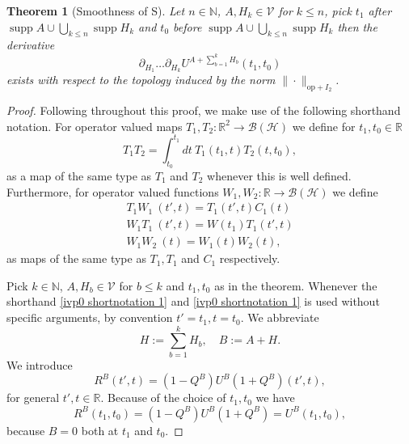 \documentclass[b5paper,draft,openbib,12pt]{memoir}
\newtheorem{Thm}[Def]{Theorem}
\DeclareMathOperator*{\supp}{supp}
\begin{document}
\begin{Thm}[Smoothness of S]\label{thm smoothness of S}
Let \(n\in\mathbb{N}\),  \(A,H_{k}\in\mathcal{V}\) for 
\(k\le n\), pick \(t_1\) 
after \(\supp A\cup \bigcup_{k\le n}\supp H_k\) and \(t_0\)
before \(\supp A\cup\bigcup_{k\le n}\supp H_k\) then 
the derivative 
\begin{equation}
  \partial_{H_1}\dots \partial_{H_k}U^{A+\sum_{b=1}^k H_b}(t_1,t_0)
\end{equation}
exists with respect to the topology induced by 
the norm \(\|\cdot\|_{\mathrm{op}+I_2}\).
\end{Thm}
\begin{proof}
Following \cite{ivp0} throughout this proof, we make use of the 
following shorthand notation. For operator valued maps 
\(T_1,T_2:\mathbb{R}^2\to \mathcal{B}(\mathcal{H}) \) we define 
for \(t_1,t_0\in\mathbb{R}\)
\begin{equation}
T_1T_2 = \int_{t_0}^{t_1}dt~ T_1(t_1,t)T_2(t,t_0),
\end{equation}
as a map of the same type as \(T_1\) and \(T_2\)
whenever this is well defined. Furthermore, for operator valued functions
\(W_1,W_2:\mathbb{R}\to \mathcal{B}(\mathcal{H})\) we define
\begin{align}\label{ivp0 shortnotation 1}
T_1W_1~(t',t)=T_1(t',t)C_1(t)\\\label{ivp0 shortnotation 2}
W_1 T_1~(t',t)=W(t_1)T_1(t',t)\\
W_1W_2~(t)=W_1(t)W_2(t),
\end{align}
as maps of the same type as \(T_1, T_1\) and \(C_1\) 
respectively.

Pick \(k\in\mathbb{N}\), \(A,H_b\in\mathcal{V}\) for \(b\le k\) 
and \(t_1,t_0\) as in the theorem. Whenever the shorthand 
\eqref{ivp0 shortnotation 1} and \eqref{ivp0 shortnotation 1}
is used without specific arguments, by convention 
\(t'=t_1,t=t_0\).  We abbreviate
\begin{equation}
H:=\sum_{b=1}^k H_b, \quad B:=A+H.
\end{equation}
We introduce 
\begin{equation}
  R^B(t',t)=(1-Q^B)U^B(1+Q^B)(t',t),
\end{equation}
for general \(t',t\in\mathbb{R}\).
Because of the choice of \(t_1,t_0\) we have
\begin{equation}\label{def R}
R^B(t_1,t_0)=(1-Q^B)U^B(1+Q^B)=U^B(t_1,t_0),
\end{equation}
because \(B=0\) both at \(t_1\) and \(t_0\).


\end{proof}
\end{document}

